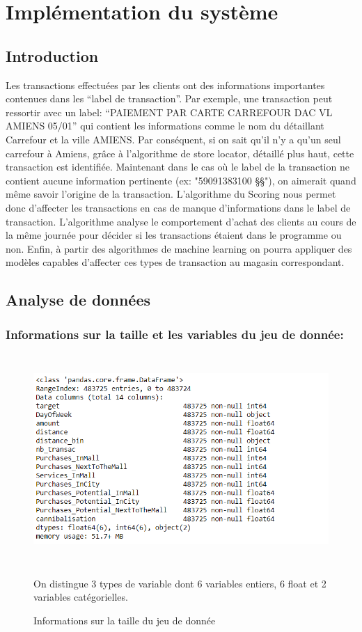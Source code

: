 \chapter{Implémentation du système}
\minitoc
\newpage

\section{Introduction}

Les transactions effectuées par les clients ont des informations importantes contenues dans les “label de transaction”. Par exemple, une transaction peut ressortir avec un label: “PAIEMENT PAR CARTE CARREFOUR DAC VL AMIENS 05/01” qui contient les informations comme le nom du détaillant Carrefour et la ville AMIENS. Par conséquent, si on sait qu'il n'y a qu’un seul carrefour à Amiens, grâce à l’algorithme de store locator, détaillé plus haut, cette transaction est identifiée. Maintenant dans le cas où le label de la transaction ne contient aucune information pertinente (ex: "59091383100 §§"), on aimerait quand même savoir l’origine de la transaction.
L'algorithme du Scoring nous permet donc d’affecter les transactions en cas de manque d'informations dans le label de transaction. L'algorithme analyse le comportement d'achat des clients au cours de  la même  journée pour décider si les transactions étaient dans le programme ou non. Enfin, à partir des algorithmes de machine learning on pourra appliquer des modèles capables d’affecter ces types de transaction au magasin correspondant.

\newpage
\section{Analyse de données}
\subsection{Informations sur la taille et les variables du jeu de donnée:}
\begin{figure}[h]
\begin{center}
\includegraphics[width=15cm,height=8cm]{images/data_infos.png}
\caption[Informations sur la taille du jeu de donnée]{Informations sur la taille du jeu de donnée}
On distingue 3 types de variable dont 6 variables entiers, 6 float et 2 variables catégorielles.
\label{monlabel}
\end{center}
\end{figure}
\newpage

